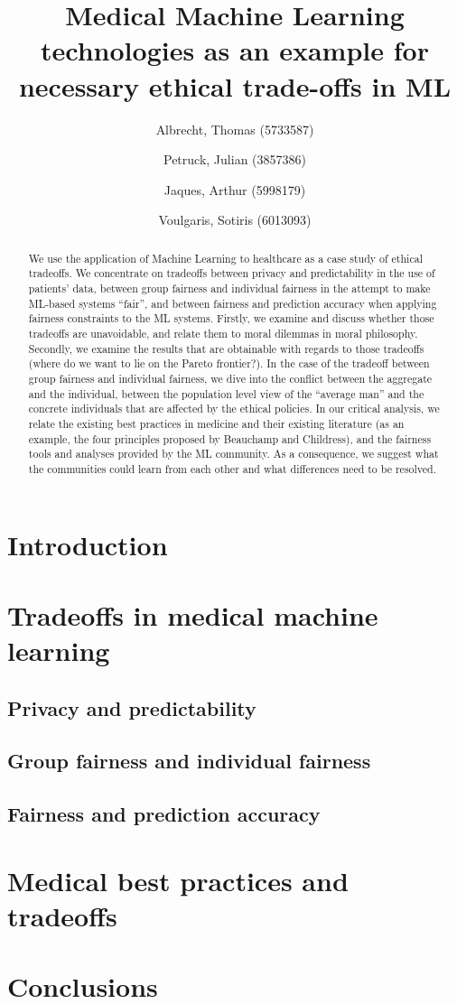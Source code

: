 \documentclass[11pt,english]{article}
\title{Medical Machine Learning technologies as an example for necessary ethical trade-offs in ML}
\author{
    Albrecht, Thomas (5733587)
    \and
    Petruck, Julian (3857386)
    \and
    Jaques, Arthur (5998179)
    \and Voulgaris, Sotiris (6013093)}
\begin{document}
\maketitle

\begin{abstract}
    We use the application of Machine Learning to healthcare as a case study of ethical tradeoffs.
    We concentrate on tradeoffs between privacy and predictability in the use of patients' data, between group fairness and individual fairness in the attempt to make ML-based systems ``fair'', and between fairness and prediction accuracy when applying fairness constraints to the ML systems.
    Firstly, we examine and discuss whether those tradeoffs are unavoidable, and relate them to moral dilemmas in moral philosophy.
    Secondly, we examine the results that are obtainable with regards to those tradeoffs (where do we want to lie on the Pareto frontier?).
    In the case of the tradeoff between group fairness and individual fairness, we dive into the conflict between the aggregate and the individual, between the population level view of the ``average man'' and the concrete individuals that are affected by the ethical policies.
    In our critical analysis, we relate the existing best practices in medicine and their existing literature (as an example, the four principles proposed by Beauchamp and Childress), and the fairness tools and analyses provided by the ML community.
    As a consequence, we suggest what the communities could learn from each other and what differences need to be resolved.
\end{abstract}


\setcounter{tocdepth}{2}
\tableofcontents



\section{Introduction}
%


\section{Tradeoffs in medical machine learning}

\subsection{Privacy and predictability}

\subsection{Group fairness and individual fairness}

\subsection{Fairness and prediction accuracy}



\section{Medical best practices and tradeoffs}


\section{Conclusions}



\clearpage


\end{document}
